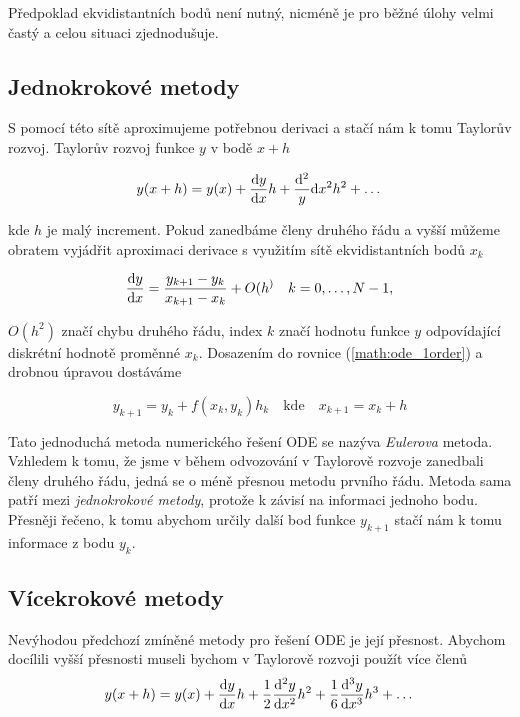 Předpoklad ekvidistantních bodů není nutný, nicméně je pro běžné úlohy velmi častý a celou situaci zjednodušuje.

\subsection{Jednokrokové metody}
 S pomocí této sítě aproximujeme potřebnou derivaci a stačí nám k tomu Taylorův rozvoj. Taylorův rozvoj funkce $y$ v bodě $x+h$

\begin{equation}
y(x+h) = y(x)+{\frac{{\rm d}y}{{\rm d}x}}h+{\frac{\rm d^2}y}{{\rm d}x^2}h^2+\dots
\end{equation}

kde $h$ je malý increment. Pokud zanedbáme členy druhého řádu a vyšší můžeme obratem vyjádřit aproximaci derivace s využitím sítě ekvidistantních bodů $x_k$

\begin{equation}
\frac{{\rm d}y}{{\rm d}x} = \frac{y_{k+1}-y_{k}}{x_{k+1}-x_{k}}+O(h^) \quad k = 0,\dots, N-1,
\end{equation}

$O(h^2)$ značí chybu druhého řádu, index $k$ značí hodnotu funkce $y$ odpovídající diskrétní hodnotě proměnné $x_k$. Dosazením do rovnice (\ref{math:ode_1order}) a drobnou úpravou dostáváme

\begin{equation}
y_{k+1} = y_{k}+f(x_k,y_k)h_k \quad {\text{kde}} \quad x_{k+1}=x_k+h
\end{equation}

Tato jednoduchá metoda numerického řešení ODE se nazýva {\it Eulerova} metoda. Vzhledem k tomu, že jsme v během odvozování v Taylorově rozvoje zanedbali členy druhého řádu, jedná se o méně přesnou metodu prvního řádu. Metoda sama patří mezi {\it jednokrokové metody}, protože k závisí na informaci jednoho bodu. Přesněji řečeno, k tomu abychom určily další bod funkce $y_{k+1}$ stačí nám k tomu informace z bodu $y_k$.

\subsection{Vícekrokové metody}
Nevýhodou předchozí zmíněné metody pro řešení ODE je její přesnost. Abychom docílili vyšší přesnosti museli bychom v Taylorově rozvoji použít více členů
\begin{equation}
y(x+h) = y(x)+\frac{{\rm d}y}{{\rm d}x}h+\frac{1}{2}\frac{{\rm d}^2 y}{{\rm d} x^2}h^2+\frac{1}{6}\frac{{\rm d}^3 y}{{\rm d} x^3}h^3+\dots
\end{equation}

